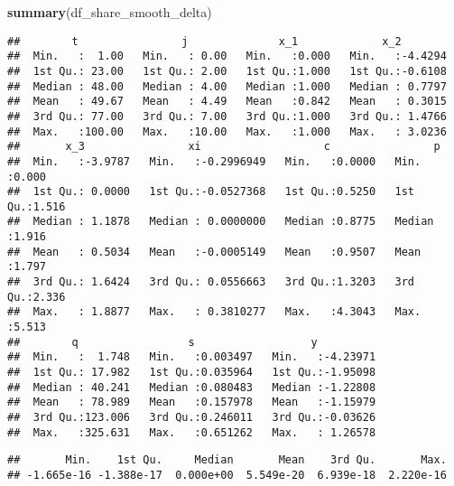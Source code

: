 \documentclass[
]{book}
\newenvironment{Shaded}{\begin{snugshade}}{\end{snugshade}}
\newcommand{\FunctionTok}[1]{\textcolor[rgb]{0.13,0.29,0.53}{\textbf{#1}}}
\newcommand{\NormalTok}[1]{#1}
\newcommand{\SpecialCharTok}[1]{\textcolor[rgb]{0.81,0.36,0.00}{\textbf{#1}}}
\begin{document}
\begin{Shaded}
\begin{Highlighting}[]
\FunctionTok{summary}\NormalTok{(df\_share\_smooth\_delta)}
\end{Highlighting}
\end{Shaded}

\begin{verbatim}
##        t                j              x_1             x_2         
##  Min.   :  1.00   Min.   : 0.00   Min.   :0.000   Min.   :-4.4294  
##  1st Qu.: 23.00   1st Qu.: 2.00   1st Qu.:1.000   1st Qu.:-0.6108  
##  Median : 48.00   Median : 4.00   Median :1.000   Median : 0.7797  
##  Mean   : 49.67   Mean   : 4.49   Mean   :0.842   Mean   : 0.3015  
##  3rd Qu.: 77.00   3rd Qu.: 7.00   3rd Qu.:1.000   3rd Qu.: 1.4766  
##  Max.   :100.00   Max.   :10.00   Max.   :1.000   Max.   : 3.0236  
##       x_3                xi                   c                p        
##  Min.   :-3.9787   Min.   :-0.2996949   Min.   :0.0000   Min.   :0.000  
##  1st Qu.: 0.0000   1st Qu.:-0.0527368   1st Qu.:0.5250   1st Qu.:1.516  
##  Median : 1.1878   Median : 0.0000000   Median :0.8775   Median :1.916  
##  Mean   : 0.5034   Mean   :-0.0005149   Mean   :0.9507   Mean   :1.797  
##  3rd Qu.: 1.6424   3rd Qu.: 0.0556663   3rd Qu.:1.3203   3rd Qu.:2.336  
##  Max.   : 1.8877   Max.   : 0.3810277   Max.   :4.3043   Max.   :5.513  
##        q                 s                  y           
##  Min.   :  1.748   Min.   :0.003497   Min.   :-4.23971  
##  1st Qu.: 17.982   1st Qu.:0.035964   1st Qu.:-1.95098  
##  Median : 40.241   Median :0.080483   Median :-1.22808  
##  Mean   : 78.989   Mean   :0.157978   Mean   :-1.15979  
##  3rd Qu.:123.006   3rd Qu.:0.246011   3rd Qu.:-0.03626  
##  Max.   :325.631   Max.   :0.651262   Max.   : 1.26578
\end{verbatim}

\begin{Shaded}
\end{Shaded}

\begin{verbatim}
##       Min.    1st Qu.     Median       Mean    3rd Qu.       Max. 
## -1.665e-16 -1.388e-17  0.000e+00  5.549e-20  6.939e-18  2.220e-16
\end{verbatim}
\end{document}
